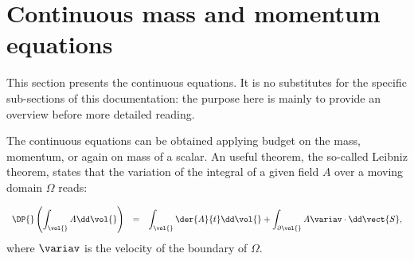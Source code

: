 
%
%
%
%


\section{Continuous mass and momentum equations}

This section presents the continuous equations. It is no substitutes for the
specific sub-sections of this documentation: the purpose here is mainly to
provide an overview before more detailed reading.

The continuous equations can be obtained applying budget on the mass,
momentum, or again on mass of a scalar. An useful theorem, the so-called
Leibniz theorem, states that the variation of the integral of a given field $A$ 
over a moving domain $\Omega$ reads:

 \begin{equation}\label{eq:goveq:leibnitz_th}
\begin{array}{r c l}
\displaystyle \DP{} \left( \int_{\vol{} } A \dd \vol{} \right) &=& 
\displaystyle \int_{\vol{} }\der{A}{t} \dd \vol{} + \int_{\partial \vol{}} A  \variav \cdot  \dd \vect{S},
\end{array}
 \end{equation}
 where $\variav$ is the velocity of the boundary of $\Omega$. 


